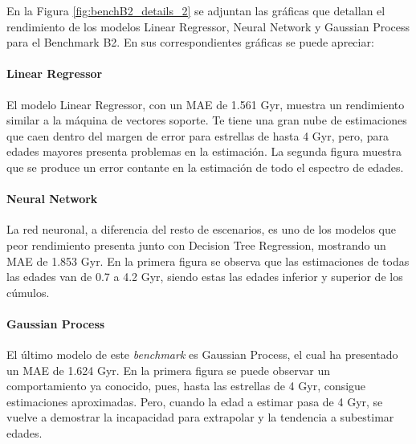 En la Figura \ref{fig:benchB2_details_2} se adjuntan las gráficas que detallan el rendimiento de los modelos Linear Regressor, Neural Network y Gaussian Process para el Benchmark B2. En sus correspondientes gráficas se puede apreciar:

\paragraph{Linear Regressor} 
El modelo Linear Regressor, con un MAE de 1.561 Gyr, muestra un rendimiento similar a la máquina de vectores soporte. Te tiene una gran nube de estimaciones que caen dentro del margen de error para estrellas de hasta 4 Gyr, pero, para edades mayores presenta problemas en la estimación. La segunda figura muestra que se produce un error contante en la estimación de todo el espectro de edades.

\paragraph{Neural Network} 
La red neuronal, a diferencia del resto de escenarios, es uno de los modelos que peor rendimiento presenta junto con Decision Tree Regression, mostrando un MAE de 1.853 Gyr. En la primera figura se observa que las estimaciones de todas las edades van de 0.7 a 4.2 Gyr, siendo estas las edades inferior y superior de los cúmulos.

\paragraph{Gaussian Process} 
El último modelo de este \emph{benchmark} es Gaussian Process, el cual ha presentado un MAE de 1.624 Gyr. En la primera figura se puede observar un comportamiento ya conocido, pues, hasta las estrellas de 4 Gyr, consigue estimaciones aproximadas. Pero, cuando la edad a estimar pasa de 4 Gyr, se vuelve a demostrar la incapacidad para extrapolar y la tendencia a subestimar edades.

